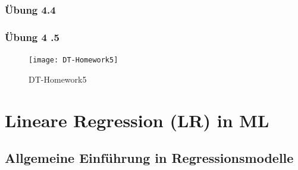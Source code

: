 \documentclass[12pt]{article}
\begin{document}
\subsubsection{Übung 4.4}


\subsubsection{Übung 4
.5}

\begin{figure}[bp]
  \centering
  \hspace*{-1.5cm} 
  \texttt{[image: DT-Homework5]}
  \caption{DT-Homework5}
\label{fig:DT_Learning2}
\end{figure}


\newpage

\section{Lineare Regression (LR) in ML \\}

\subsection{Allgemeine Einführung in Regressionsmodelle}
\end{document}

